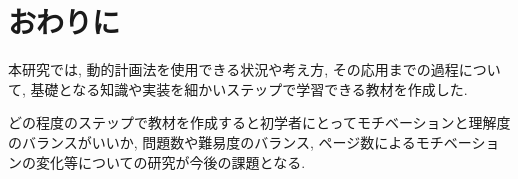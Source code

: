 \section{おわりに}

本研究では, 動的計画法を使用できる状況や考え方, その応用までの過程について, 基礎となる知識や実装を細かいステップで学習できる教材を作成した. 

どの程度のステップで教材を作成すると初学者にとってモチベーションと理解度のバランスがいいか, 問題数や難易度のバランス, ページ数によるモチベーションの変化等についての研究が今後の課題となる. 
